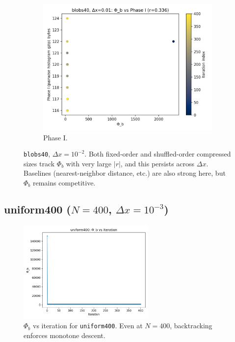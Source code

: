 \documentclass[11pt,a4paper]{article}
\numberwithin{equation}{section}
\newcommand{\phib}{\Phi_b}
\begin{document}
\begin{figure}[h!]
\begin{subfigure}[b]{0.32\textwidth}
\includegraphics[width=\textwidth]{figures/blobs40_dx0.01_phib_vs_phase1.png}
\caption{Phase I.}
\end{subfigure}
\caption{\texttt{blobs40}, $\Delta x{=}10^{-2}$. Both fixed-order and shuffled-order compressed sizes track $\phib$ with very large $|r|$, and this persists across $\Delta x$. Baselines (nearest-neighbor distance, etc.) are also strong here, but $\phib$ remains competitive.}
\label{fig:blobs40_corr}
\end{figure}

\subsection{uniform400 ($N{=}400$, $\Delta x = 10^{-3}$)}
\begin{figure}[h!]
\centering
\includegraphics[width=0.6\textwidth]{figures/uniform400_dx0.001_phib_vs_iter.png}
\caption{$\phib$ vs iteration for \texttt{uniform400}. Even at $N{=}400$, backtracking enforces monotone descent.}
\label{fig:uniform400_iter}
\end{figure}
\end{document}
